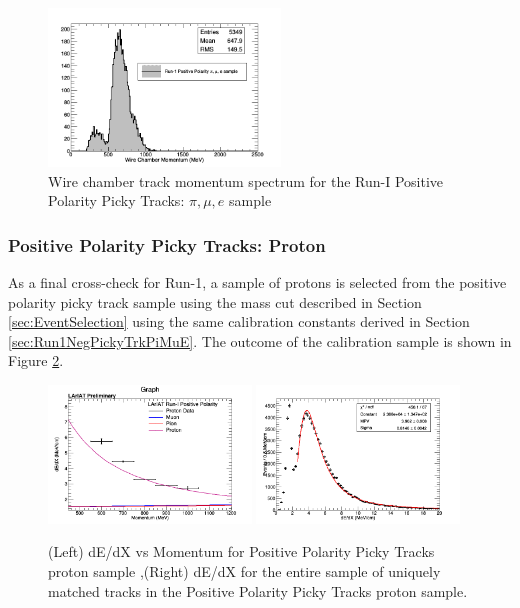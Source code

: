 \begin{figure}[htb]
\centering
\includegraphics[width=0.55\textwidth]{images/WCTrkMomentumRun1PosPiMuE.png}
\caption{Wire chamber track momentum spectrum for the Run-I Positive Polarity Picky Tracks: $\pi, \mu, e$ sample  }
\label{fig:Run1PosPickyTrkPiMuEMomentumSpec}
\end{figure}

\subsubsection{Positive Polarity Picky Tracks: Proton}\label{sec:Run1PosPickyTrkProton}

As a final cross-check for Run-1, a sample of protons is selected from the positive polarity picky track sample using the mass cut described in Section \ref{sec:EventSelection} using the same calibration constants derived in Section \ref{sec:Run1NegPickyTrkPiMuE}. The outcome of the calibration sample is shown in Figure \ref{fig:Run1PosPickyTrkProtonResults}.

\begin{figure}[htb]
\centering
\includegraphics[width=0.48\textwidth]{images/dEdXvsMomentumPosPolRun1ProtonFineBin.png}
\includegraphics[width=0.48\textwidth]{images/dEdXNegPolRun1Proton.png}
\caption{(Left) dE/dX vs Momentum for Positive Polarity Picky Tracks proton sample ,(Right) dE/dX for the entire sample of uniquely matched tracks in the Positive Polarity Picky Tracks proton sample.}
\label{fig:Run1PosPickyTrkProtonResults}
\end{figure}

